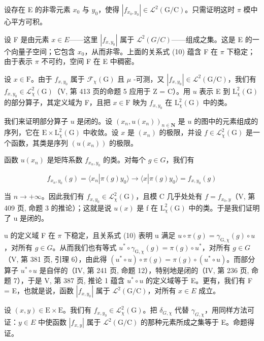 设存在 E 的非零元素 \(x_{0}\) 与 \(y_{0}\)，使得 \(|f_{x_{0},y_{0}}| \in \mathcal{L}^{2}(\mathrm{G/C})\)。只需证明这时 \(\pi\) 模中心平方可积。

 设 F 是由元素 \(x \in E\)——这里 \(|f_{x,y_{0}}|\) 属于 \(\mathcal{L}^{2}(G/C)\)——组成之集。这是 E 的一个向量子空间；它包含 \(x_{0}\)，从而非零。上面的关系式 (10) 蕴含 F 在 \(\pi\) 下稳定；由于表示 \(\pi\) 不可约，空间 F 在 E 中稠密。

 设 \(x \in \mathrm{F}\)。由于 \(f_{x,y_0}\) 属于 \(\mathcal{F}_{\chi}(\mathrm{G})\) 且 \(\mu\) -可测，又 \(|f_{x,y_0}| \in \mathcal{L}^2(\mathrm{G/C})\)，我们有 \(f_{x,y_0} \in \mathcal{L}_{\chi}^2(\mathrm{G})\)（V, 第 413 页的命题 5 应用于 Z = C）。用 \(u\) 表示 E 到 \(\mathrm{L}_{\chi}^{2}(\mathrm{G})\) 的部分算子，其定义域为 F，且把 \(x \in \mathrm{F}\) 映为 \(f_{x,y_0}\) 在 \(\mathrm{L}_{\chi}^{2}(\mathrm{G})\) 中的类。

 我们来证明部分算子 \(u\) 是闭的。设 \((x_{n}, u(x_{n}))_{n \in \mathbf{N}}\) 是 \(u\) 的图中的元素组成的序列，它在 \(\mathrm{E} \times \mathrm{L}_{\chi}^{2}(\mathrm{G})\) 中收敛。设 \(x\) 是 \((x_{n})\) 的极限，并设 \(f \in \mathcal{L}_{\chi}^{2}(\mathrm{G})\) 是一个函数，其类是序列 \((u(x_{n}))\) 的极限。

函数 \(u(x_{n})\) 是矩阵系数 \(f_{x_{n},y_{0}}\) 的类。对每个 \(g \in G\)，我们有

\[
f _ {x _ {n}, y _ {0}} (g) = \langle x _ {n} | \pi (g) y _ {0} \rangle \rightarrow \langle x | \pi (g) y _ {0} \rangle = f _ {x, y _ {0}} (g)
\]

当 \(n \to +\infty\)。因此我们有 \(f_{x,y_{0}} \in \mathcal{L}_{\chi}^{2}(\mathrm{G})\)，且模 C 几乎处处有 \(f = f_{x_{0},y}\)（V, 第 409 页, 命题 3 的推论）；这就是说 \(u(x)\) 是 f 在 \(\mathrm{L}_{\chi}^{2}(\mathrm{G})\) 中的类。于是我们证明了 u 是闭的。

u 的定义域 F 在 \(\pi\) 下稳定，且关系式 (10) 表明 u 满足 \(u \circ \pi(g) = \gamma_{\mathrm{G},\chi}(g) \circ u\)，对所有 \(g \in G\)。从而我们也有等式 \(u^{*} \circ \gamma_{\mathrm{G},\chi}(g) = \pi(g) \circ u^{*}\)，对所有 \(g \in G\)（V, 第 381 页, 引理 6），由此得 \((u^{*} \circ u) \circ \pi(g) = \pi(g) \circ (u^{*} \circ u)\)。而部分算子 \(u^{*} \circ u\) 是自伴的（IV, 第 241 页, 命题 12），特别地是闭的（IV, 第 236 页, 命题 7），于是 V, 第 387 页, 推论 1 蕴含 \(u^{*} \circ u\) 的定义域等于 E。更有，我们有 F = E，也就是说，函数 \(|f_{x,y_{0}}|\) 属于 \(\mathcal{L}^{2}(\mathrm{G}/\mathrm{C})\)，对所有 \(x \in E\) 成立。

设 \((x,y)\in\mathrm{E}\times\mathrm{E}\)。我们有 \(f_{x,y_{0}}\in\mathcal{L}_{\chi}^{2}(\mathrm{G})\)。把 \(\delta_{G,\chi}\) 代替 \(\gamma_{G,\chi}\)，用同样方法可证：\(y\in E\) 中使函数 \(|f_{x,y}|\) 属于 \(\mathcal{L}^{2}(\mathrm{G}/\mathrm{C})\) 的那种元素所成之集等于 E。命题得证。

